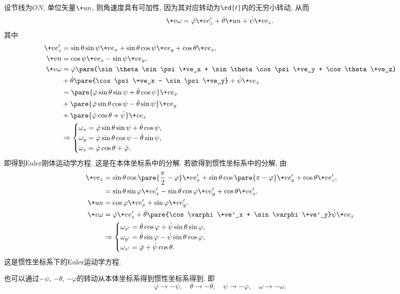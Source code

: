\documentclass[../LectureNotes.tex]{subfiles}
\begin{document}
设节线为$ON$, 单位矢量$\+un$, 则角速度具有可加性, 因为其对应转动为$\rd{t}$内的无穷小转动, 从而
\[ \+v\omega = \dot\varphi\+ve'_z + \dot\theta\+un + \dot\psi\+ve_z. \]
其中
\begin{align*}
    \+ve'_z &= \sin\theta \sin\psi \+ve_x + \sin\theta\cos\psi\+ve_y + \cos\theta\+ve_z, \\
    \+vn &= \cos\psi \+ve_x - \sin\psi\+ve_y, \\
    \+v\omega &= \dot\varphi\pare{\sin\theta \sin\psi \+ve_x + \sin\theta\cos\psi\+ve_y + \cos\theta\+ve_z} \\
    & + \dot\theta\pare{\cos\psi\+ve_x - \sin\psi\+ve_y} + \dot\psi\+ve_z \\
    &= \pare{\dot\varphi \sin\theta\sin\psi + \dot\theta\cos\psi} \+ve_x \\
    &+ \pare{\dot\varphi \sin\theta\cos\psi - \dot\theta\sin\psi} \+ve_y \\
    &+ \pare{\dot\varphi \cos\theta + \dot\psi}\+ve_z \\
    &\Rightarrow \begin{cases}
        \omega_x = \dot\varphi \sin\theta\sin\psi + \dot\theta\cos\psi, \\
        \omega_y = \dot\varphi \sin\theta\cos\psi - \dot\theta\sin\psi, \\
        \omega_z = \dot\varphi \cos\theta + \dot\varphi.
    \end{cases}
\end{align*}
即得到Euler刚体运动学方程. 这是在本体坐标系中的分解. 若欲得到惯性坐标系中的分解, 由
\begin{align*}
    \+ve_z &= \sin\theta\cos\pare{\frac{\pi}{2} - \varphi}\+ve'_x + \sin\theta \cos\pare{\pi - \varphi} \+ve'_y + \cos\theta\+ve'_z, \\
    &= \sin\theta\sin\varphi \+ve'_x - \sin\theta\cos\varphi\+ve'_y + \cos\theta\+ve'_z. \\
    \+un &= \cos\varphi\+ve'_x + \sin\varphi\+ve'_y. \\
    \+v\omega &= \dot{\varphi}\+ve'_z + \dot\theta\pare{\cos\varphi\+ve'_x + \sin\varphi\+ve'_y}\dot\psi\+ve_z \\
    &\Rightarrow \begin{cases}
        \omega_{x'} = \dot\theta\cos\varphi + \dot\psi\sin\theta\sin\varphi, \\
        \omega_{y'} = \dot\theta\sin\varphi - \dot\psi\sin\theta\cos\varphi, \\
        \omega_{z'} = \dot\varphi + \dot\psi\cos\theta.
    \end{cases}
\end{align*}
这是惯性坐标系下的Euler运动学方程.
\begin{remark}
    也可以通过$-\psi$, $-\theta$, $-\varphi$的转动从本体坐标系得到惯性坐标系得到. 即
    \[ \varphi\rightarrow -\psi,\quad \theta \rightarrow -\theta, \quad \psi\rightarrow -\varphi, \quad \omega \rightarrow -\omega. \]
\end{remark}
\end{document}
